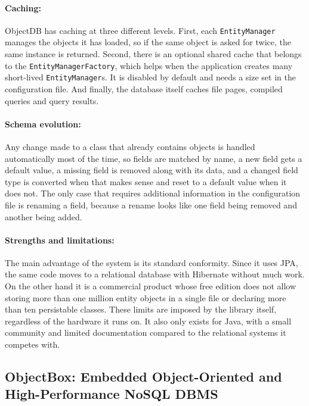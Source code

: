 \documentclass{article}
\begin{document}
\paragraph{Caching:} ObjectDB has caching at three different levels. First,
each \texttt{EntityManager} manages the objects it has loaded, so if the same
object is asked for twice, the same instance is returned. Second, there is an
optional shared cache that belongs to the \texttt{EntityManagerFactory}, which
helps when the application creates many short-lived \texttt{EntityManager}s. It
is disabled by default and needs a size set in the configuration
file\cite{objectdb_manual}. And finally, the database itself caches file pages,
compiled queries and query results.

\paragraph{Schema evolution:} Any change made to a class that already contains
objects is handled automatically most of the time, so fields are matched by name, a
new field gets a default value, a missing field is removed along with its data,
and a changed field type is converted when that makes sense and reset to a
default value when it does not. The only case that requires additional
information in the configuration file is renaming a field, because a rename looks
like one field being removed and another being added\cite{objectdb_manual}.

\paragraph{Strengths and limitations:} The main advantage of the system is its
standard conformity. Since it uses JPA, the same code moves to a relational
database with Hibernate without much work. On the other hand it is a commercial
product whose free edition does not allow storing more than one million entity
objects in a single file or declaring more than ten persistable
classes\cite{objectdb_license}. These limits are imposed by the library itself,
regardless of the hardware it runs on. It also only exists for Java, with a small
community and limited documentation compared to the relational systems it
competes with.


\subsection{ObjectBox: Embedded Object-Oriented and High-Performance NoSQL DBMS}
\end{document}
